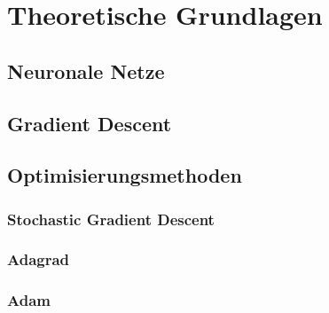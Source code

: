 \section{Theoretische Grundlagen}\label{Theoretische Grundlagen}


\subsection{Neuronale Netze}\label{Neuronale Netze}

\subsection{Gradient Descent}\label{Gradient Descent}

\subsection{Optimisierungsmethoden}\label{Optimisierungsmethoden}

\subsubsection{Stochastic Gradient Descent}\label{Stochastic Gradient Descent}

\subsubsection{Adagrad}\label{Adagrad}

\subsubsection{Adam}\label{Adam}